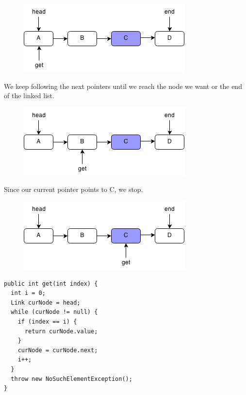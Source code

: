 \documentclass[11pt,oneside]{book}
\makeatletter
\def\maxwidth#1{\ifdim\Gin@nat@width>#1 #1\else\Gin@nat@width\fi}
\makeatother
\begin{document}
\vspace{5px}\begin{figure}[H]\centering
        \includegraphics[width=0.66\maxwidth{\textwidth}]{linkedlistget.png}
        \end{figure}

We keep following the next pointers until we reach the node we want or the end of the linked list.

\vspace{5px}\begin{figure}[H]\centering
        \includegraphics[width=0.66\maxwidth{\textwidth}]{linkedlistget2.png}
        \end{figure}

Since our current pointer points to C, we stop.

\vspace{5px}\begin{figure}[H]\centering
        \includegraphics[width=0.66\maxwidth{\textwidth}]{linkedlistget3.png}
        \end{figure}

\begin{lstlisting}
public int get(int index) {
  int i = 0;
  Link curNode = head;
  while (curNode != null) {
    if (index == i) {
      return curNode.value;
    }
    curNode = curNode.next;
    i++;
  }
  throw new NoSuchElementException();
}
\end{lstlisting}
\end{document}

